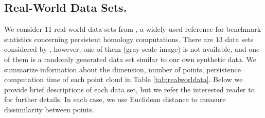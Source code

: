 \documentclass[utf8]{formatting_stuff/frontiersFPHY}
\theoremstyle{plain}
\theoremstyle{definition}
\begin{document}
\subsection{Real-World Data Sets.} \label{sec: realworlddata}
We consider $11$ real world data sets from \cite{roadmap2017}, a widely used reference for benchmark statistics concerning persistent homology computations. There are $13$ data sets considered by \cite{roadmap2017}, however, one of them (gray-scale image) is not available, and one of them is a randomly generated data set 
similar to our own synthetic data. We summarize information about the dimension, number of points, persistence computation time of each point cloud in Table \ref{tab:realworldata}. Below we provide brief descriptions of each data set, but we refer the interested reader to \cite{roadmap2017} for further details. In each case, we use Euclidean distance to measure dissimilarity between points. 
\end{document}
